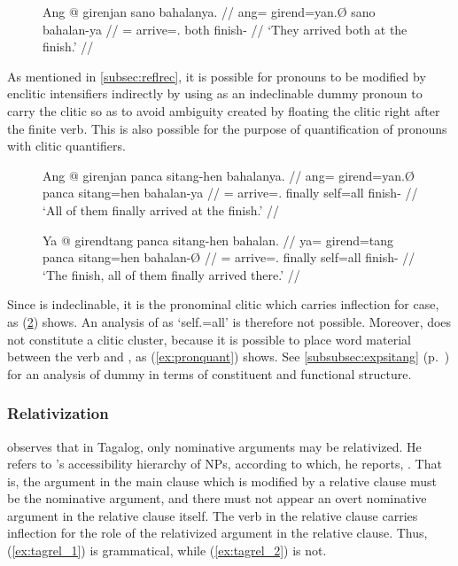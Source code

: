 \begin{figure}[t]
\ex\label{ex:freequantplcmt}
\begingl
	\gla Ang @ girenjan sano bahalanya. //
	\glb ang= girend=yan.Ø sano bahalan-ya //
	\glc \AgtT{}= arrive=\TplM{}.\Aarg{} both finish-\Loc{} //
	\glft `They arrived both at the finish.' //
\endgl\xe
\end{figure}

As mentioned in \autoref{subsec:reflrec}, it is possible for pronouns to be
modified by enclitic intensifiers indirectly by using
 as an indeclinable dummy pronoun to carry the clitic
so as to avoid ambiguity created by floating the clitic right after the finite
verb. This is also possible for the purpose of quantification of pronouns with
clitic quantifiers.

\begin{figure}[h]
\pex\label{ex:pronquant}
\a\label{ex:pronquant_1}\begingl
	\gla Ang @ girenjan panca sitang-hen bahalanya. //
	\glb ang= girend=yan.Ø panca sitang=hen bahalan-ya //
	\glc \AgtT{}= arrive=\TplM{}.\Aarg{} finally self=all finish-\Loc{} //
	\glft `All of them finally arrived at the finish.' //
\endgl

\a\label{ex:pronquant_2}\begingl
	\gla Ya @ girendtang panca sitang-hen bahalan. //
	\glb ya= girend=tang panca sitang=hen bahalan-Ø //
	\glc \LocT{}= arrive=\TplM{}.\Aarg{} finally self=all finish-\Top{} //
	\glft `The finish, all of them finally arrived there.' //
\endgl
\xe
\end{figure}

Since  is indeclinable, it is the pronominal clitic which
carries inflection for case, as (\ref{ex:pronquant_2}) shows. An analysis of
 as `self.\Top{}=all' is therefore not possible.
Moreover,  does not constitute a clitic
cluster, because it is possible to place word material between the verb and
, as (\ref{ex:pronquant}) shows. See
\autoref{subsubsec:expsitang} (p.~\pageref{subsubsec:expsitang}) for an
analysis of dummy  in terms of constituent and functional
structure.

\subsubsection{Relativization}
\label{subsubsec:relz}

\citet{kroeger1991} observes that in Tagalog, only nominative arguments may be
relativized. He refers to \citet{keenancomrie1977}'s accessibility hierarchy of
NPs, according to which, he reports, . That is, the argument in the main clause which is modified by a
relative clause must be the nominative argument, and there must not appear an
overt nominative argument in the relative clause itself. The verb in the
relative clause carries inflection for the role of the relativized argument in
the relative clause. Thus, (\ref{ex:tagrel_1}) is grammatical, while 
(\ref{ex:tagrel_2}) is not.

